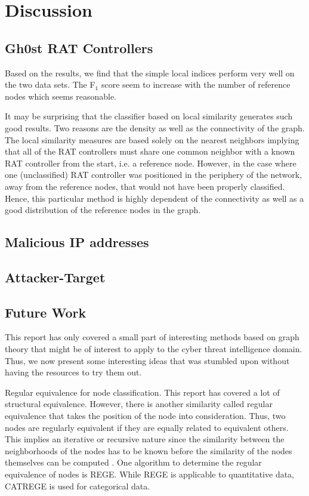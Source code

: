 \chapter{Discussion}

\section{Gh0st RAT Controllers}
Based on the results, we find that the simple local indices perform very well on the two data sets. The F$_1$ score seem to increase with the number of reference nodes which seems reasonable. 

It may be surprising that the classifier based on local similarity generates such good results. Two reasons are the density as well as the connectivity of the graph. The local similarity measures are based solely on the nearest neighbors implying that all of the RAT controllers must share one common neighbor with a known RAT controller from the start, i.e. a reference node. However, in the case where one (unclassified) RAT controller was positioned in the periphery of the network, away from the reference nodes, that would not have been properly classified. Hence, this particular method is highly dependent of the connectivity as well as a good distribution of the reference nodes in the graph. 


\section{Malicious IP addresses}

\section{Attacker-Target}

\section{Future Work}
This report has only covered a small part of interesting methods based on graph theory that might be of interest to apply to the cyber threat intelligence domain. Thus, we now present some interesting ideas that was stumbled upon without having the resources to try them out. 

Regular equivalence for node classification. This report has covered a lot of structural equivalence. However, there is another similarity called regular equivalence that takes the position of the node into consideration. Thus, two nodes are regularly equivalent if they are equally related to equivalent others. This implies an iterative or recursive nature since the similarity between the neighborhoods of the nodes has to be known before the similarity of the nodes themselves can be computed \cite{leicht2006}. One algorithm to determine the regular equivalence of nodes is REGE. While REGE is applicable to quantitative data, CATREGE is used for categorical data. 

